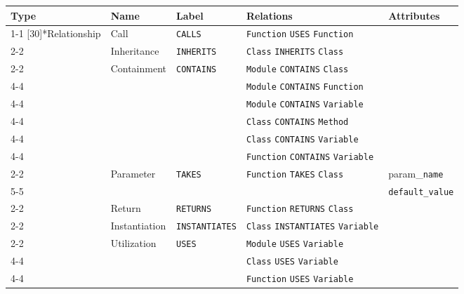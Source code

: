 \begin{tabularx}{\textwidth}{p{1.8cm}llXl}
\toprule
\textbf{Type} & \textbf{Name} & \textbf{Label} & \textbf{Relations} & \textbf{Attributes} \\
\cmidrule{1-1}\cmidrule{2-2}\cmidrule{3-3}\cmidrule{4-4}\cmidrule{5-5}
\multirow{15}[30]{*}{Relationship} & Call & \texttt{CALLS} & \texttt{Function} \texttt{USES} \texttt{Function} &  \\
\cmidrule{2-2}\cmidrule{3-3}\cmidrule{4-4}\cmidrule{5-5}
 & Inheritance & \texttt{INHERITS} & \texttt{Class} \texttt{INHERITS} \texttt{Class} &  \\
\cmidrule{2-2}\cmidrule{3-3}\cmidrule{4-4}\cmidrule{5-5}
 & \multirow{6}[12]{*}{Containment} & \multirow{6}[12]{*}{\texttt{CONTAINS}} & \texttt{Module} \texttt{CONTAINS} \texttt{Class} &  \\
\cmidrule{4-4}\cmidrule{5-5}
 &  &  & \texttt{Module} \texttt{CONTAINS} \texttt{Function} &  \\
\cmidrule{4-4}\cmidrule{5-5}
 &  &  & \texttt{Module} \texttt{CONTAINS} \texttt{Variable} &  \\
\cmidrule{4-4}\cmidrule{5-5}
 &  &  & \texttt{Class} \texttt{CONTAINS} \texttt{Method} &  \\
\cmidrule{4-4}\cmidrule{5-5}
 &  &  & \texttt{Class} \texttt{CONTAINS} \texttt{Variable} &  \\
\cmidrule{4-4}\cmidrule{5-5}
 &  &  & \texttt{Function} \texttt{CONTAINS} \texttt{Variable} &  \\
\cmidrule{2-2}\cmidrule{3-3}\cmidrule{4-4}\cmidrule{5-5}
 & \multirow{2}[4]{*}{Parameter} & \multirow{2}[4]{*}{\texttt{TAKES}} & \multirow{2}[4]{*}{\texttt{Function} \texttt{TAKES} \texttt{Class}} & param\_\texttt{name} \\
\cmidrule{5-5}
 &  &  &  & \texttt{default\_value} \\
\cmidrule{2-2}\cmidrule{3-3}\cmidrule{4-4}\cmidrule{5-5}
 & Return & \texttt{RETURNS} & \texttt{Function} \texttt{RETURNS} \texttt{Class} &  \\
\cmidrule{2-2}\cmidrule{3-3}\cmidrule{4-4}\cmidrule{5-5}
 & Instantiation & \texttt{INSTANTIATES} & \texttt{Class} \texttt{INSTANTIATES} \texttt{Variable} &  \\
\cmidrule{2-2}\cmidrule{3-3}\cmidrule{4-4}\cmidrule{5-5}
 & \multirow{3}[6]{*}{Utilization} & \multirow{3}[6]{*}{\texttt{USES}} & \texttt{Module} \texttt{USES} \texttt{Variable} &  \\
\cmidrule{4-4}\cmidrule{5-5}
 &  &  & \texttt{Class} \texttt{USES} \texttt{Variable} &  \\
\cmidrule{4-4}\cmidrule{5-5}
 &  &  & \texttt{Function} \texttt{USES} \texttt{Variable} &  \\
\bottomrule
\end{tabularx}

